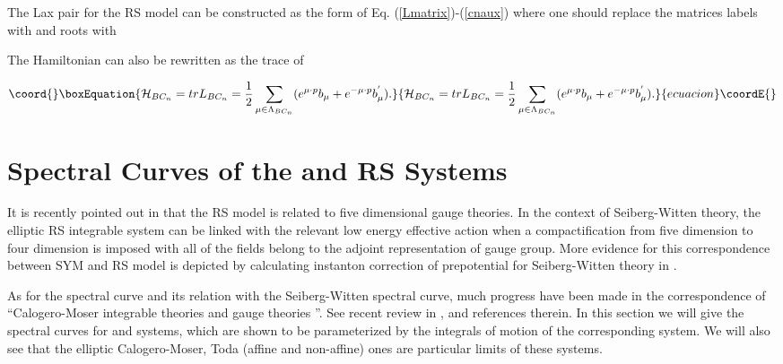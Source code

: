 \documentclass[a4paper,12pt]{article}
\begin{document}
The Lax pair for the \coordHE{} RS model can be constructed as
the form of Eq. (\ref{Lmatrix})-(\ref{cnaux}) where one
should replace the matrices labels with \coordHE{} and roots with \coordHE{}

The Hamiltonian \coordHE{} can also be rewritten
as the trace of \coordHE{}

\begin{equation}\coord{}\boxEquation{
\mathcal{H}_{BC_{n}}=trL_{BC_{n}}=\frac{1}{2}\sum_{\mu \in \Lambda
_{BC_{n}}}(e^{\mu \cdot p}b_{\mu }+e^{-\mu \cdot p}b_{\mu }^{^{\prime }}).
}{
\mathcal{H}_{BC_{n}}=trL_{BC_{n}}=\frac{1}{2}\sum_{\mu \in \Lambda
_{BC_{n}}}(e^{\mu \cdot p}b_{\mu }+e^{-\mu \cdot p}b_{\mu }^{^{\prime }}).
}{ecuacion}\coordE{}\end{equation}

\section{Spectral Curves of the \coordHE{} and \coordHE{} RS Systems}

\setcounter{equation}{0} \label{spec} It is recently pointed out in \cite
{n,bm1,mir,mir1} that the \coordHE{} RS model is related to five
dimensional gauge theories. In the context of Seiberg-Witten
theory, the elliptic RS integrable system can be linked with
the relevant low energy effective action when a
compactification from five dimension to four dimension is
imposed with all of the fields belong to the adjoint
representation of \coordHE{} gauge group\cite{bm1}. More
evidence for this correspondence between SYM and RS model is
depicted by calculating instanton correction of prepotential
for \coordHE{} Seiberg-Witten theory in \cite{ohta}.

As for the spectral curve and its relation with the
Seiberg-Witten spectral curve, much progress have been made
in the correspondence of ``Calogero-Moser integrable
theories and gauge theories ''. See recent review in
\cite{hp2}, \cite{Marbook} and references therein. In this
section we will give the spectral curves for \coordHE{} and
\coordHE{} systems, which are shown to be parameterized by the
integrals of motion of the corresponding system. We will also
see that the elliptic Calogero-Moser, Toda (affine and
non-affine) ones are particular limits of these systems.
\end{document}
